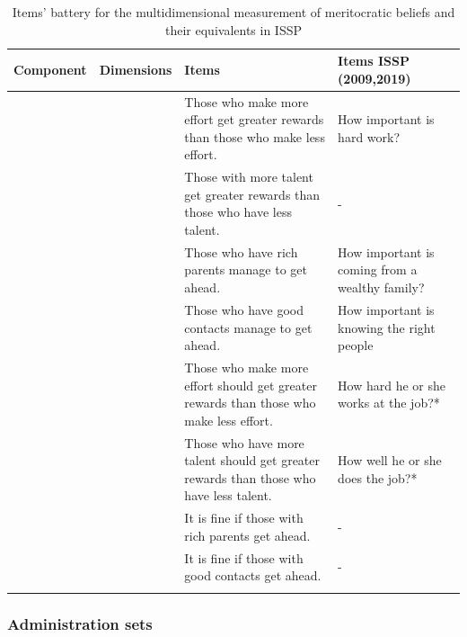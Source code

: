 \documentclass[
  10pt,
  a4paper,
]{article}
\begin{document}
\begin{table}[!h]

\caption{\label{tab:table-indicadores}Items' battery for the multidimensional measurement of meritocratic beliefs and their equivalents in ISSP}
\centering
\fontsize{10}{12}\selectfont
\begin{tabu} to 
\toprule
Component & Dimensions & Items & Items ISSP (2009,2019)\\
\midrule
 &  & Those who make more effort get greater rewards than those who make less effort. & How important is hard work?\\
 &  & Those with more talent get greater rewards than those who have less talent. & -\\
 &  & Those who have rich parents manage to get ahead. & How important is coming from a wealthy family?\\
 &  & Those who have good contacts manage to get ahead. & How important is knowing the right people\\
 &  & Those who make more effort should get greater rewards than those who make less effort. & How hard he or she works at the job?*\\
 &  & Those who have more talent should get greater rewards than those who have less talent. & How well he or she does the job?*\\
 &  & It is fine if those with rich parents get ahead. & -\\
 &  & It is fine if those with good contacts get ahead. & -\\
\bottomrule
{}\\
\end{tabu}
\end{table}
\pagebreak

\subsubsection{Administration sets}\label{administration-sets}
\end{document}
